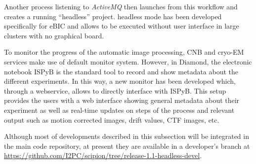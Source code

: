 Another process listening to \emph{ActiveMQ} then launches \scipion from this workflow and creates a running ``headless'' project. \scipion headless mode has been developed specifically for eBIC and allows \scipion to be executed without user interface in large clusters with no graphical board. 



To monitor the progress of the automatic image processing, CNB and \scilifelab cryo-EM services make use of \scipion default monitor system. However, in Diamond, the electronic notebook ISPyB is the standard tool to record and show metadata about the different experiments. In this way, a new monitor has been developed which, through a webservice, allows \scipion to directly interface with ISPyB.  This setup provides the users with a web interface showing general metadata about their experiment as well as  real-time updates on steps of the process and relevant output such as motion corrected images, drift values, CTF images, etc.

Although most of developments described in this subsection will be integrated in the main \scipion code repository, at present they are available in a developer's branch  at \url{https://github.com/I2PC/scipion/tree/release-1.1-headless-devel}.
